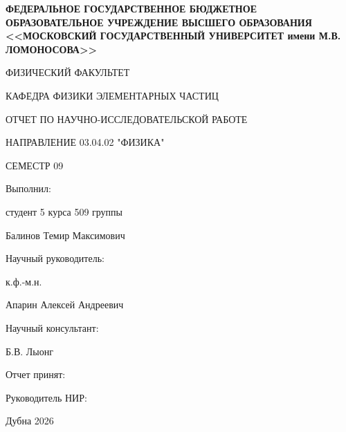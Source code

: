 \documentclass[a4paper]{extarticle}
\begin{document}
\begin{titlepage}
    \newpage
    \begin{center}
    
        \bfseries ФЕДЕРАЛЬНОЕ ГОСУДАРСТВЕННОЕ БЮДЖЕТНОЕ ОБРАЗОВАТЕЛЬНОЕ УЧРЕЖДЕНИЕ ВЫСШЕГО ОБРАЗОВАНИЯ <<МОСКОВСКИЙ ГОСУДАРСТВЕННЫЙ УНИВЕРСИТЕТ имени М.В. ЛОМОНОСОВА>>
        
        \vspace{1cm}
        ФИЗИЧЕСКИЙ ФАКУЛЬТЕТ
        \vspace{1cm}
    
        КАФЕДРА ФИЗИКИ ЭЛЕМЕНТАРНЫХ ЧАСТИЦ
    
        \vspace{6cm}
        ОТЧЕТ ПО НАУЧНО-ИССЛЕДОВАТЕЛЬСКОЙ РАБОТЕ 
        
        НАПРАВЛЕНИЕ 03.04.02 "ФИЗИКА"
        
        СЕМЕСТР 09
    \end{center}

    \vspace{4cm}

    \begin{flushright}
        Выполнил:
        
        студент 5 курса 509 группы
        
        Балинов Темир Максимович
    \end{flushright}
    
    \vspace{0.5cm}

    \begin{flushright}
        Научный руководитель:
        
        к.ф.-м.н.
        
        Апарин Алексей Андреевич

        Научный консультант:
        
        Б.В. Лыонг
    \end{flushright}

    \vspace{\fill}

    \begin{flushleft}
        Отчет принят: 

        \vspace{0.5cm}

        Руководитель НИР:
    \end{flushleft}
    
    \begin{center}
        Дубна 2026
    \end{center}

\end{titlepage}
    
\end{document}
